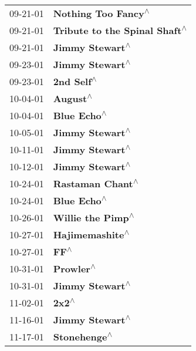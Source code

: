 \begin{supertabular}{p{0.25\columnwidth}p{0.75\columnwidth}}
 09-21-01 &                        \textbf{Nothing Too Fancy\textsuperscript{$\wedge$}} \\
 09-21-01 &              \textbf{Tribute to the Spinal Shaft\textsuperscript{$\wedge$}} \\
 09-21-01 &                            \textbf{Jimmy Stewart\textsuperscript{$\wedge$}} \\
 09-23-01 &                            \textbf{Jimmy Stewart\textsuperscript{$\wedge$}} \\
 09-23-01 &                                 \textbf{2nd Self\textsuperscript{$\wedge$}} \\
 10-04-01 &                                   \textbf{August\textsuperscript{$\wedge$}} \\
 10-04-01 &                                \textbf{Blue Echo\textsuperscript{$\wedge$}} \\
 10-05-01 &                            \textbf{Jimmy Stewart\textsuperscript{$\wedge$}} \\
 10-11-01 &                            \textbf{Jimmy Stewart\textsuperscript{$\wedge$}} \\
 10-12-01 &                            \textbf{Jimmy Stewart\textsuperscript{$\wedge$}} \\
 10-24-01 &                           \textbf{Rastaman Chant\textsuperscript{$\wedge$}} \\
 10-24-01 &                                \textbf{Blue Echo\textsuperscript{$\wedge$}} \\
 10-26-01 &                          \textbf{Willie the Pimp\textsuperscript{$\wedge$}} \\
 10-27-01 &                            \textbf{Hajimemashite\textsuperscript{$\wedge$}} \\
 10-27-01 &                                       \textbf{FF\textsuperscript{$\wedge$}} \\
 10-31-01 &                                  \textbf{Prowler\textsuperscript{$\wedge$}} \\
 10-31-01 &                            \textbf{Jimmy Stewart\textsuperscript{$\wedge$}} \\
 11-02-01 &                                      \textbf{2x2\textsuperscript{$\wedge$}} \\
 11-16-01 &                            \textbf{Jimmy Stewart\textsuperscript{$\wedge$}} \\
 11-17-01 &                               \textbf{Stonehenge\textsuperscript{$\wedge$}} \\

\end{supertabular}

